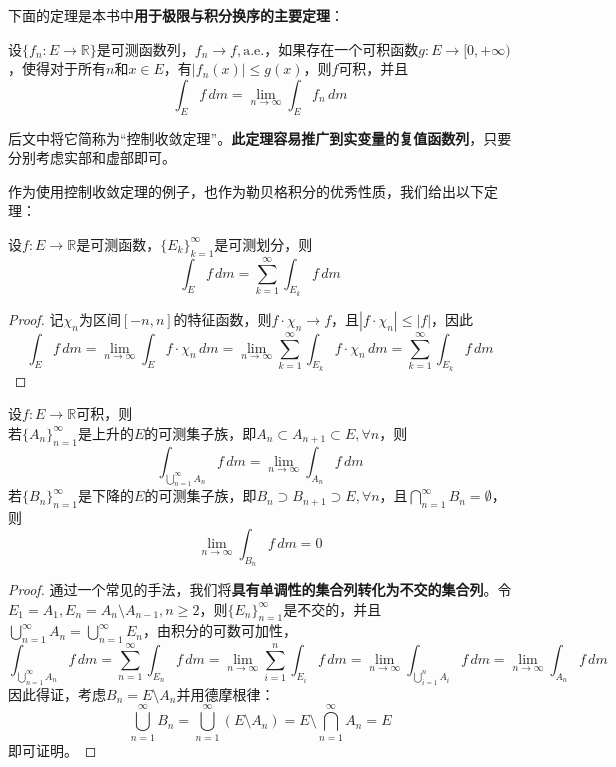 下面的定理是本书中\textbf{用于极限与积分换序的主要定理}：
\begin{theorem}[Lebesgue控制收敛定理]
    设$\{f_n:E\to\mathbb{R}\}$是可测函数列，$f_n\to f,\text{a.e.}$，如果存在一个可积函数$g:E\to[0,+\infty)$，使得对于所有$n$和$x\in E$，有$|f_n(x)|\leq g(x)$，则$f$可积，并且
    \[\int_{E}f\,dm=\lim_{n\to\infty}\int_{E}f_n\,dm\]
\end{theorem}

后文中将它简称为“控制收敛定理”。\textbf{此定理容易推广到实变量的复值函数列}，只要分别考虑实部和虚部即可。

作为使用控制收敛定理的例子，也作为勒贝格积分的优秀性质，我们给出以下定理：
\begin{theorem}[勒贝格积分的可数可加性]
    设$f:E\to\mathbb{R}$是可测函数，$\{E_k\}_{k=1}^{\infty}$是可测划分，则
    \[\int_{E}f\,dm=\sum_{k=1}^{\infty}\int_{E_k}f\,dm\]
\end{theorem}
\begin{proof}
    记$\chi_n$为区间$[-n,n]$的特征函数，则$f\cdot\chi_n\to f$，且$|f\cdot\chi_n|\leq |f|$，因此
    \[\int_{E}f\,dm=\lim_{n\to\infty}\int_{E}f\cdot\chi_n\,dm=\lim_{n\to\infty}\sum_{k=1}^{\infty}\int_{E_k}f\cdot\chi_n\,dm=\sum_{k=1}^{\infty}\int_{E_k}f\,dm\]
\end{proof}
\begin{corollary}
    设$f:E\to\mathbb{R}$可积，则\\
    若$\{A_n\}_{n=1}^{\infty}$是上升的$E$的可测集子族，即$A_n\subset A_{n+1}\subset E,\forall n$，则
    \[\int_{\bigcup_{n=1}^{\infty}A_n}f\,dm=\lim_{n\to\infty}\int_{A_n}f\,dm\]
    若$\{B_n\}_{n=1}^{\infty}$是下降的$E$的可测集子族，即$B_n\supset B_{n+1}\supset E,\forall n$，且$\bigcap_{n=1}^{\infty}B_n=\emptyset$，则
    \[\lim_{n\to\infty}\int_{B_n}f\,dm=0\]
\end{corollary}
\begin{proof}
通过一个常见的手法，我们将\textbf{具有单调性的集合列转化为不交的集合列}。令$E_1=A_1,E_n=A_n\setminus A_{n-1},n\geq 2$，则$\{E_n\}_{n=1}^{\infty}$是不交的，并且$\bigcup_{n=1}^{\infty}A_n=\bigcup_{n=1}^{\infty}E_n$，由积分的可数可加性，
\[\int_{\bigcup_{n=1}^{\infty}A_n}f\,dm=\sum_{n=1}^{\infty}\int_{E_n}f\,dm=\lim_{n\to\infty}\sum_{i=1}^{n}\int_{E_i}f\,dm=\lim_{n\to\infty}\int_{\bigcup_{i=1}^{n}A_i}f\,dm=\lim_{n\to\infty}\int_{A_n}f\,dm\]
因此得证，考虑$B_n=E\setminus A_n$并用德摩根律：
\[\bigcup_{n=1}^{\infty}B_n=\bigcup_{n=1}^{\infty}(E\setminus A_n)=E\setminus \bigcap_{n=1}^{\infty}A_n=E\]
即可证明。
\end{proof}


